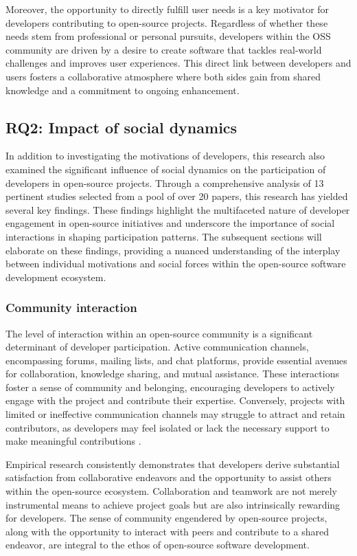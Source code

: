 Moreover, the opportunity to directly fulfill user needs is a key motivator for developers contributing to open-source projects. Regardless of whether these needs stem from professional or personal pursuits, developers within the OSS community are driven by a desire to create software that tackles real-world challenges and improves user experiences. This direct link between developers and users fosters a collaborative atmosphere where both sides gain from shared knowledge and a commitment to ongoing enhancement.

\subsection{RQ2: Impact of social dynamics}

In addition to investigating the motivations of developers, this research also examined the significant influence of social dynamics on the participation of developers in open-source projects. Through a comprehensive analysis of 13 pertinent studies selected from a pool of over 20 papers, this research has yielded several key findings. These findings highlight the multifaceted nature of developer engagement in open-source initiatives and underscore the importance of social interactions in shaping participation patterns. The subsequent sections will elaborate on these findings, providing a nuanced understanding of the interplay between individual motivations and social forces within the open-source software development ecosystem.

\subsubsection{Community interaction}
The level of interaction within an open-source community is a significant determinant of developer participation. Active communication channels, encompassing forums, mailing lists, and chat platforms, provide essential avenues for collaboration, knowledge sharing, and mutual assistance. These interactions foster a sense of community and belonging, encouraging developers to actively engage with the project and contribute their expertise. Conversely, projects with limited or ineffective communication channels may struggle to attract and retain contributors, as developers may feel isolated or lack the necessary support to make meaningful contributions \cite{05bitzer2007intrinsic,11gerosa2021shifting,20freeman2007material}.


Empirical research consistently demonstrates that developers derive substantial satisfaction from collaborative endeavors and the opportunity to assist others within the open-source ecosystem. Collaboration and teamwork are not merely instrumental means to achieve project goals but are also intrinsically rewarding for developers. The sense of community engendered by open-source projects, along with the opportunity to interact with peers and contribute to a shared endeavor, are integral to the ethos of open-source software development.

